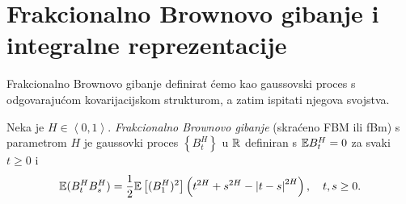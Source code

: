 \documentclass[main.tex]{subfiles}
\begin{document}
\section[FBM i integralne reprezentacije]{Frakcionalno Brownovo gibanje i integralne reprezentacije}\label{sec:gl-fbm}
Frakcionalno Brownovo gibanje definirat ćemo kao gaussovski proces
s odgovarajućom kovarijacijskom strukturom, a zatim ispitati njegova svojstva.

\begin{definicija}\label{def:fbm}
	Neka je \( H \in \left\langle 0,1 \right\rangle \). \emph{Frakcionalno Brownovo gibanje} (skraćeno FBM ili fBm) s parametrom \( H \) je gaussovki proces \( \left\{ B^H_t \right\} \) u \( \mathbb{R} \) definiran s
	\( \mathbb{E} B^H_t = 0 \) za svaki \( t \ge 0 \) i
	\begin{equation} \label{eq:deffbm}
		\mathbb{E}(B^H_t B^H_s) = \frac 12 \mathbb{E} \left[ (B^H_1)^2 \right]
		\left( t^{2H} + s^{2H} - \left| {t-s} \right|^{2H} \right), \quad t,s\ge 0.
	\end{equation}
\end{definicija}
\end{document}
